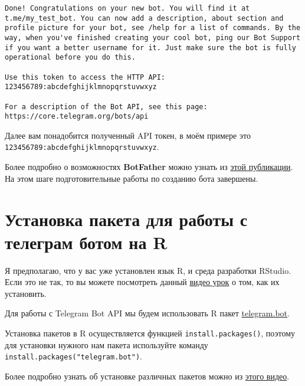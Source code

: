 \documentclass[
]{book}
\begin{document}
\begin{verbatim}
Done! Congratulations on your new bot. You will find it at t.me/my_test_bot. You can now add a description, about section and profile picture for your bot, see /help for a list of commands. By the way, when you've finished creating your cool bot, ping our Bot Support if you want a better username for it. Just make sure the bot is fully operational before you do this.

Use this token to access the HTTP API:
123456789:abcdefghijklmnopqrstuvwxyz

For a description of the Bot API, see this page: https://core.telegram.org/bots/api
\end{verbatim}

Далее вам понадобится полученный API токен, в моём примере это \texttt{123456789:abcdefghijklmnopqrstuvwxyz}.

Более подробно о возможностях \textbf{BotFather} можно узнать из \href{https://botcreators.ru/blog/botfather-instrukciya/}{этой публикации}. На этом шаге подготовительные работы по созданию бота завершены.

\hypertarget{ux443ux441ux442ux430ux43dux43eux432ux43aux430-ux43fux430ux43aux435ux442ux430-ux434ux43bux44f-ux440ux430ux431ux43eux442ux44b-ux441-ux442ux435ux43bux435ux433ux440ux430ux43c-ux431ux43eux442ux43eux43c-ux43dux430-r}{%
\section{Установка пакета для работы с телеграм ботом на R}\label{ux443ux441ux442ux430ux43dux43eux432ux43aux430-ux43fux430ux43aux435ux442ux430-ux434ux43bux44f-ux440ux430ux431ux43eux442ux44b-ux441-ux442ux435ux43bux435ux433ux440ux430ux43c-ux431ux43eux442ux43eux43c-ux43dux430-r}}

Я предполагаю, что у вас уже установлен язык R, и среда разработки RStudio. Если это не так, то вы можете посмотреть данный \href{https://youtu.be/wFUoaeGEMmY}{видео урок} о том, как их установить.

Для работы с Telegram Bot API мы будем использовать R пакет \href{https://CRAN.R-project.org/package=telegram.bot}{telegram.bot}.

Установка пакетов в R осуществляется функцией \texttt{install.packages()}, поэтому для установки нужного нам пакета используйте команду \texttt{install.packages("telegram.bot")}.

Более подробно узнать об установке различных пакетов можно из \href{https://youtu.be/1UvrWoZugic}{этого видео}.
\end{document}

